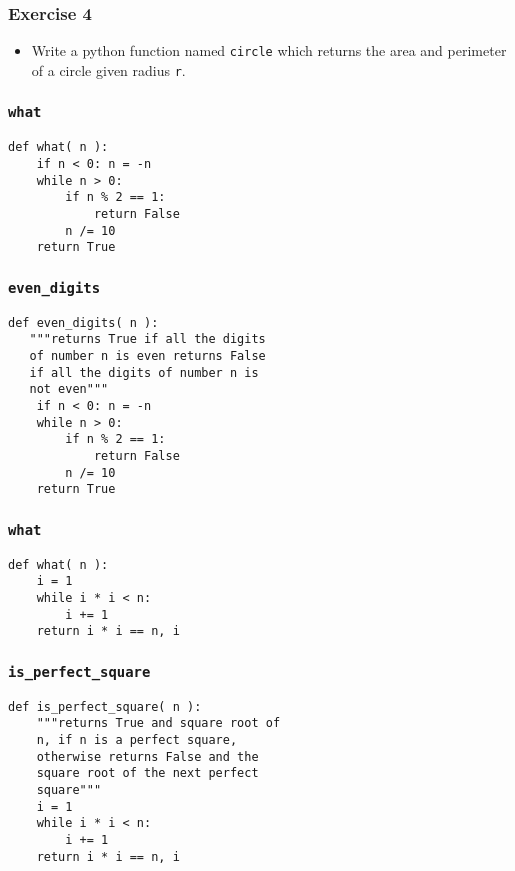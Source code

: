 \documentclass[17pt,compress]{beamer}
\begin{document}
\begin{frame}
\frametitle{Exercise 4}
\label{sec-11}

\begin{itemize}
\item Write a python function named \texttt{circle} which returns the area and
  perimeter of a circle given radius \texttt{r}.
\end{itemize}
\end{frame}
\begin{frame}[fragile]
\frametitle{\texttt{what}}
\label{sec-12}

\lstset{language=Python}
\begin{small}
\begin{lstlisting}
def what( n ):
    if n < 0: n = -n
    while n > 0:
        if n % 2 == 1:
            return False
        n /= 10
    return True
\end{lstlisting}
\end{small}
\end{frame}
\begin{frame}[fragile]
\frametitle{\texttt{even\_digits}}
\label{sec-13}

\lstset{language=Python}
\begin{small}
\begin{lstlisting}
def even_digits( n ):
   """returns True if all the digits 
   of number n is even returns False 
   if all the digits of number n is 
   not even"""
    if n < 0: n = -n
    while n > 0:
        if n % 2 == 1:
            return False
        n /= 10
    return True
\end{lstlisting}
\end{small}
\end{frame}
\begin{frame}[fragile]
\frametitle{\texttt{what}}
\label{sec-14}

\lstset{language=Python}
\begin{lstlisting}
def what( n ):
    i = 1
    while i * i < n:
        i += 1
    return i * i == n, i
\end{lstlisting}
\end{frame}
\begin{frame}[fragile]
\frametitle{\texttt{is\_perfect\_square}}
\label{sec-15}

\lstset{language=Python}
\begin{small}
\begin{lstlisting}
def is_perfect_square( n ):
    """returns True and square root of 
    n, if n is a perfect square, 
    otherwise returns False and the 
    square root of the next perfect 
    square"""
    i = 1
    while i * i < n:
        i += 1
    return i * i == n, i
\end{lstlisting}
\end{small}
\end{frame}
\end{document}
